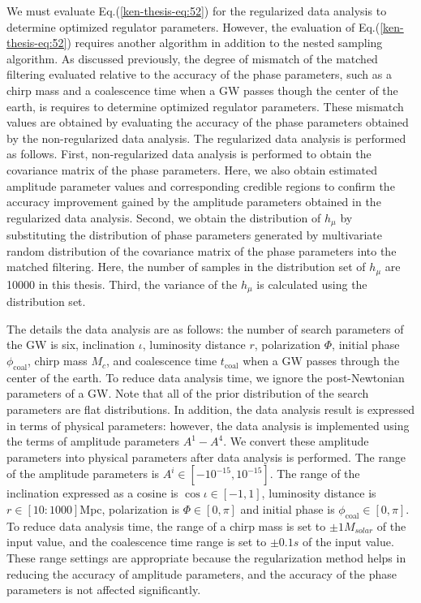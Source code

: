 \documentclass[%
 aps,
 prd,
 amsmath,amssymb,
 reprint,%
superscriptaddress
]{revtex4-1}
\begin{document}
We must evaluate Eq.(\ref{ken-thesis-eq:52}) for the regularized data analysis to determine optimized regulator parameters. However, the evaluation of Eq.(\ref{ken-thesis-eq:52}) requires another algorithm in addition to the nested sampling algorithm. As discussed previously, the degree of mismatch of the matched filtering evaluated relative to the accuracy of the phase parameters, such as a chirp mass and a coalescence time when a GW passes though the center of the earth, is requires to determine optimized regulator parameters. These mismatch values are obtained by evaluating the accuracy of the phase parameters obtained by the non-regularized data analysis. The regularized data analysis  is performed as follows. First, non-regularized data analysis is performed to obtain the covariance matrix of the phase parameters. Here, we also obtain estimated amplitude parameter values and corresponding credible regions to confirm the accuracy improvement gained by the amplitude parameters obtained in the regularized data analysis. Second, we obtain the distribution of
$h_{\mu}$ by substituting the distribution of phase parameters generated by multivariate random distribution of the covariance matrix of the phase parameters into the matched filtering. Here, the number of samples in the distribution set of
$h_{\mu}$ are 10000 in this thesis. Third, the variance of the
$h_{\mu}$ is calculated using the distribution set.

The details the data analysis are as follows: the number of search parameters of the GW is six, inclination $\iota$, luminosity distance $r$, polarization $\Phi$, initial phase $\phi_{\mathrm{coal}}$, chirp mass $M_{c}$, and coalescence time $t_{\mathrm{coal}}$ when a GW passes through the center of the earth. To reduce data analysis time, we ignore the post-Newtonian parameters of a GW. Note that all of the prior distribution of the search parameters are flat distributions. In addition, the data analysis result is expressed in terms of physical parameters: however, the data analysis is implemented using the terms of amplitude parameters
$A^{1}-A^{4}$. We convert these amplitude parameters into physical parameters after data analysis is performed. The range of the amplitude parameters is
$A^{i}\in [-10^{-15},10^{-15}]$. The range of the inclination expressed as a cosine is
$\cos\iota \in [-1,1]$, luminosity distance is
$r\in[10:1000]$Mpc, polarization is
$\Phi\in[0,\pi]$ and initial phase is
$\phi_{\mathrm{coal}}\in[0,\pi]$. To reduce data analysis time, the range of a chirp mass is set to
$\pm 1 M_{solar}$ of the input value, and the coalescence time range is set to
$\pm 0.1 s$ of the input value. These range settings are appropriate because the regularization method helps in reducing the accuracy of amplitude parameters, and the accuracy of the phase parameters is not affected significantly.
\end{document}
